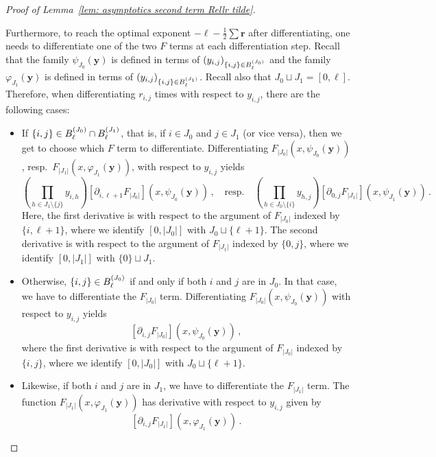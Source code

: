 \documentclass[10pt,a4paper]{amsart}
\newcommand{\abs}[1]{{\left|#1\right|}}
\newcommand{\br}{{\mathbf{r}}}
\newcommand{\by}{{\mathbf{y}}}
\newcommand{\pairs}{{\rm B}}
\begin{document}
\begin{proof}[Proof of Lemma~\ref{lem: asymptotics second term Rellr tilde}]
\begin{itemize}
    Furthermore, to reach the optimal exponent $-\ell-\frac12\sum\br$ after differentiating, one needs to differentiate one of the two $F$ terms at each differentiation step.
    Recall that the family $\psi_{J_0}(\by)$ is defined in terms of $(y_{i,j})_{\{i,j\}\in \pairs_\ell^{(J_0)}}$ and the family $\varphi_{J_1}(\by)$ is defined in terms of $(y_{i,j})_{\{i,j\}\in \pairs_\ell^{(J_1)}}$.
    Recall also that $J_0 \sqcup J_1 = [0,\ell]$.
    Therefore, when differentiating $r_{i,j}$ times with respect to $y_{i,j}$, there are the following cases:
    \begin{itemize}
        \item If $\{i,j\}\in \pairs_\ell^{(J_0)} \cap \pairs_\ell^{(J_1)}$, that is, if $i\in J_0$ and $j\in J_1$ (or vice versa), then we get to choose which $F$ term to differentiate.
        Differentiating $F_{\abs{J_0}}( x,\psi_{J_0}(\by) )$, resp.\ $F_{\abs{J_1}}( x,\varphi_{J_1}(\by) )$, with respect to $y_{i,j}$ yields
        \[
            \left( \prod_{h\in J_1 \setminus \{j\}} y_{i,h} \right) \left[ \partial_{i,\ell+1} F_{\abs{J_0}} \right]( x,\psi_{J_0}(\by) ) \,,
            \quad\text{resp.}\quad
            \left( \prod_{h\in J_0 \setminus \{i\}} y_{h,j} \right) \left[ \partial_{0,j} F_{\abs{J_1}} \right]( x,\psi_{J_1}(\by) ) \,.
        \]
        Here, the first derivative is with respect to the argument of $F_{\abs{J_0}}$ indexed by $\{i,\ell+1\}$, where we identify $[0,\abs{J_0}]$ with $J_0 \sqcup \{\ell+1\}$.
        The second derivative is with respect to the argument of $F_{\abs{J_1}}$ indexed by $\{0,j\}$, where we identify $[0,\abs{J_1}]$ with $\{0\} \sqcup J_1$.
        \item Otherwise, $\{i,j\} \in \pairs_\ell^{(J_0)}$ if and only if both $i$ and $j$ are in $J_0$.
        In that case, we have to differentiate the $F_\abs{J_0}$ term.
        Differentiating $F_{\abs{J_0}}( x,\psi_{J_0}(\by) )$ with respect to $y_{i,j}$ yields
        \[
            \left[ \partial_{i,j} F_{\abs{J_0}} \right]( x,\psi_{J_0}(\by) ) \,,
        \]
        where the first derivative is with respect to the argument of $F_{\abs{J_0}}$ indexed by $\{i,j\}$, where we identify $[0,\abs{J_0}]$ with $J_0 \sqcup \{\ell+1\}$.
        \item Likewise, if both $i$ and $j$ are in $J_1$, we have to differentiate the $F_\abs{J_1}$ term.
        The function $F_{\abs{J_1}}( x,\varphi_{J_1}(\by) )$ has derivative with respect to $y_{i,j}$ given by
        \[
            \left[ \partial_{i,j} F_{\abs{J_1}} \right]( x,\varphi_{J_1}(\by) ) \,.
        \]

\end{itemize}
\end{itemize}
\end{proof}
\end{document}
